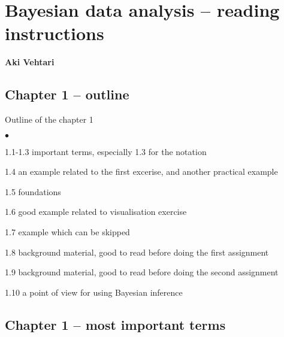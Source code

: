 \documentclass[a4paper,11pt,english]{article}
\begin{document}
\thispagestyle{empty}

\section*{Bayesian data analysis -- reading instructions} 
\smallskip
{\bf Aki Vehtari}
\smallskip

\subsection*{Chapter 1 -- outline}

Outline of the chapter 1
\begin{list}{$\bullet$}{\parsep=0pt\itemsep=2pt}
\item 1.1-1.3 important terms, especially 1.3 for the notation
\item 1.4 an example related to the first excerise, and another
  practical example
\item 1.5 foundations
\item 1.6 good example related to visualisation exercise
\item {\color{gray}1.7 example which can be skipped}
\item 1.8 background material, good to read before doing the first assignment
\item 1.9 background material, good to read before doing the second assignment
\item 1.10 a point of view for using Bayesian inference
\end{list}

\subsection*{Chapter 1 -- most important terms}
\end{document}
